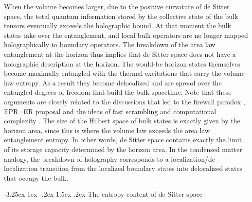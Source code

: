 \documentclass[a4paper,12pt]{article}
\makeatletter
\renewcommand\subsection{\@startsection{subsection}{2}{\z@}%
                                     {-3.25ex\@plus -1ex \@minus -.2ex}%
                                     {1.5ex \@plus .2ex}%
                                     {\normalfont\bfseries}}
\makeatother
\begin{document}
    
  When the volume becomes larger, due to the positive curvature of de Sitter space, the total quantum information stored by the collective state of the bulk tensors eventually exceeds the holographic bound.  At that moment the bulk states  take 
  over the entanglement, and local bulk operators are no longer mapped holographically to boundary operators. The breakdown of the area law entanglement at the horizon thus implies  that de Sitter space does not have a holographic description at the horizon.  The would-be horizon states themselves become maximally entangled with the thermal excitations that carry the volume law entropy. As a result they become delocalized and are spread over the entangled degrees of freedom that build the bulk spacetime.  Note that these arguments are closely related to the discussions that led to the firewall paradox \cite{AMPS}, EPR=ER proposal \cite{ER=EPR} and the ideas of fast scrambling \cite{FastScrambler} and computational complexity \cite{Complexity}.  The size of the Hilbert space of bulk states is exactly given by the horizon area, since this  is where the volume law   exceeds the area law   entanglement entropy. In other words, de 
  Sitter space  contains exactly the limit of its storage capacity determined by the horizon 
  area.  In the condensed matter analogy, the breakdown of holography corresponds to a localization/de-localization  transition \cite{Grover} from the localized boundary states into delocalized states that occupy the bulk. 
  
  

  








\subsection{The entropy content of de Sitter space}
\end{document}
